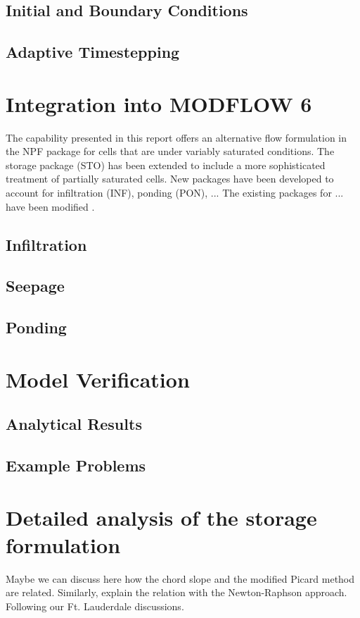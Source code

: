 \documentclass[fleqn]{article}
\begin{document}
\subsection{Initial and Boundary Conditions}
\subsection{Adaptive Timestepping}

\section{Integration into MODFLOW 6}
The capability presented in this report offers an alternative flow
formulation in the NPF package for cells that are under variably 
saturated conditions. The storage package (STO) has been extended
to include a more sophisticated treatment of partially saturated
cells. New packages have been developed to account for infiltration (INF),
ponding (PON), ... The existing packages for ... have been modified .

\subsection{Infiltration}
\subsection{Seepage}
\subsection{Ponding}

\section{Model Verification}
\subsection{Analytical Results}
\subsection{Example Problems}

\appendix
\section{Detailed analysis of the storage formulation}
Maybe we can discuss here how the chord slope and the modified
Picard method are related. Similarly, explain the relation
with the Newton-Raphson approach. Following our Ft. Lauderdale
discussions.


 
\end{document}
